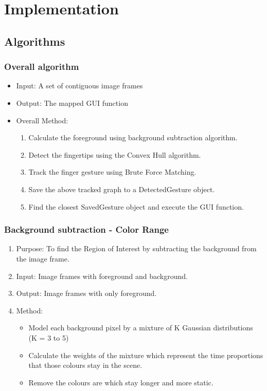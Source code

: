\documentclass[11pt]{report}
\begin{document}
\chapter{Implementation}
\section{Algorithms}
\subsection{Overall algorithm}
\begin{itemize}
    \item Input: A set of contiguous image frames
    \item Output: The mapped GUI function
    \item Overall Method:
    \begin{enumerate}
        \item Calculate the foreground using background subtraction algorithm.
        \item Detect the fingertips using the Convex Hull algorithm.
        \item Track the finger gesture using Brute Force Matching.
        \item Save the above tracked graph to a DetectedGesture object.
        \item Find the closest SavedGesture object and execute the GUI function.
    \end{enumerate}
\end{itemize}
\subsection{Background subtraction - Color Range}
\begin{enumerate}
    \item Purpose: To find the Region of Interest by subtracting the background from the image frame.
    \item Input: Image frames with foreground and background.
    \item Output: Image frames with only foreground. 
    \item Method:
    \begin{itemize}
        \item Model each background pixel by a mixture of K Gaussian distributions (K = 3 to 5)
        \item Calculate the weights of the mixture which represent the time proportions that those colours stay in the scene.
        \item Remove the colours are which stay longer and more static.
    \end{itemize}
\end{enumerate}
\end{document}
